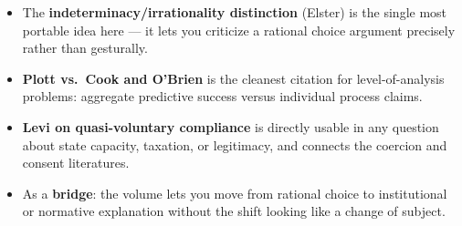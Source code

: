 \documentclass[12pt]{article}
\begin{document}
\begin{itemize}[leftmargin=*, itemsep=4pt]
    \item The \textbf{indeterminacy/irrationality distinction} (Elster) is the
    single most portable idea here --- it lets you criticize a rational choice
    argument precisely rather than gesturally.
    \item \textbf{Plott vs.\ Cook and O'Brien} is the cleanest citation for
    level-of-analysis problems: aggregate predictive success versus individual
    process claims.
    \item \textbf{Levi on quasi-voluntary compliance} is directly usable in any
    question about state capacity, taxation, or legitimacy, and connects the
    coercion and consent literatures.
    \item As a \textbf{bridge}: the volume lets you move from rational choice to
    institutional or normative explanation without the shift looking like a
    change of subject.
\end{itemize}
\end{document}

